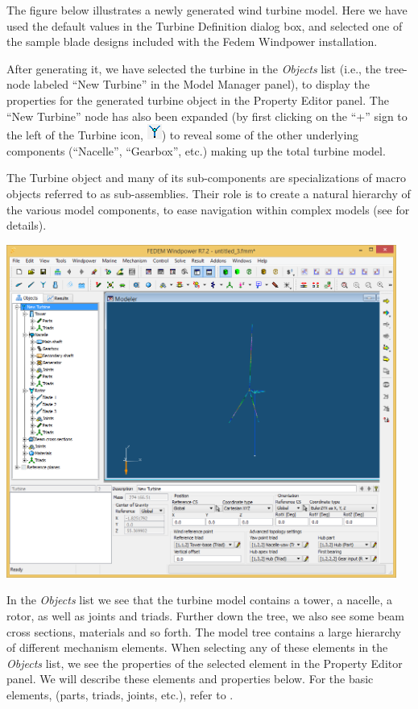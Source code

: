 
The figure below illustrates a newly generated wind turbine model.
Here we have used the default values in the Turbine Definition dialog box,
and selected one of the sample blade designs included with the Fedem Windpower
installation.

After generating it, we have selected the turbine in the {\sl Objects} list
(i.e., the tree-node labeled ``New Turbine'' in the Model Manager panel), to
display the properties for the generated turbine object in the Property Editor
panel. The ``New Turbine'' node has also been expanded (by first clicking on
the ``+'' sign to the left of the Turbine icon,
\includegraphics[scale=0.45]{Figures/Icons/turbineDef}) to reveal some of the
other underlying components (``Nacelle'', ``Gearbox'', etc.)
making up the total turbine model.

The Turbine object and many of its sub-components are specializations of macro
objects referred to as sub-assemblies.
Their role is to create a natural hierarchy of the various model components,
to ease navigation within complex models
(see  for details).

\includegraphics[width=0.96\textwidth]{Figures/3b-Main2}

In the {\sl Objects} list we see that the turbine model contains a tower,
a nacelle, a rotor, as well as joints and triads. Further down the tree,
we also see some beam cross sections, materials and so forth.
The model tree contains a large hierarchy of different mechanism elements.
When selecting any of these elements in the {\sl Objects} list,
we see the properties of the selected element in the Property Editor panel.
We will describe these elements and properties below.
For the basic elements, (parts, triads, joints, etc.),
refer to .

